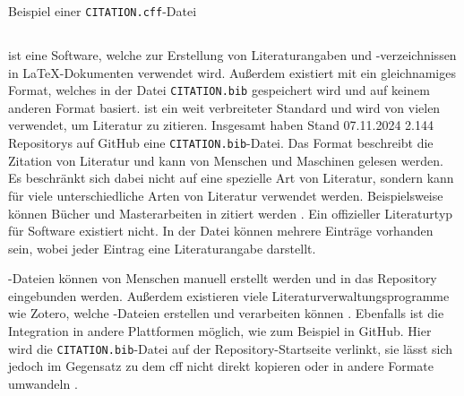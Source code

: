 \begin{listing}
    \inputminted{yaml}{../CITATION.cff}
    \caption{Beispiel einer \texttt{CITATION.cff}-Datei}
    \label{lst:cff_example}
\end{listing}

\subsection{}
\label{subsec:bibtex_format}
 ist eine Software, welche zur Erstellung von Literaturangaben und -verzeichnissen in \LaTeX{}-Dokumenten verwendet wird.
Außerdem existiert mit  ein gleichnamiges Format, welches in der Datei \texttt{CITATION.bib} gespeichert wird und auf keinem anderen Format basiert.
 ist ein weit verbreiteter Standard und wird von vielen verwendet, um Literatur zu zitieren.
Insgesamt haben Stand 07.11.2024 2.144 Repositorys auf GitHub eine \texttt{CITATION.bib}-Datei.
Das Format beschreibt die Zitation von Literatur und kann von Menschen und Maschinen gelesen werden.
Es beschränkt sich dabei nicht auf eine spezielle Art von Literatur, sondern kann für viele unterschiedliche Arten von Literatur verwendet werden.
Beispielsweise können Bücher und Masterarbeiten in  zitiert werden \autocite{patashnik_bibtexing_1988}.
Ein offizieller Literaturtyp für Software existiert nicht.
In der Datei können mehrere Einträge vorhanden sein, wobei jeder Eintrag eine Literaturangabe darstellt.

-Dateien können von Menschen manuell erstellt werden und in das Repository eingebunden werden.
Außerdem existieren viele Literaturverwaltungsprogramme wie Zotero, welche -Dateien erstellen und verarbeiten können \autocite{zotero_zotero_2024}.
Ebenfalls ist die Integration in andere Plattformen möglich, wie zum Beispiel in GitHub.
Hier wird die \texttt{CITATION.bib}-Datei auf der Repository-Startseite verlinkt, sie lässt sich jedoch im Gegensatz zu dem \gls{cff} nicht direkt kopieren oder in andere Formate umwandeln \autocite{github_about_2024-2}.

